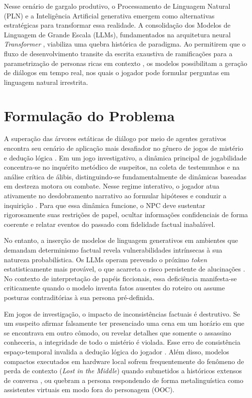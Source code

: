 Nesse cenário de gargalo produtivo, o Processamento de Linguagem Natural (PLN) e a Inteligência Artificial generativa emergem como alternativas estratégicas para transformar essa realidade. A consolidação dos Modelos de Linguagem de Grande Escala (LLMs), fundamentados na arquitetura neural \textit{Transformer} \cite{vaswani2017attention}, viabiliza uma quebra histórica de paradigma. Ao permitirem que o fluxo de desenvolvimento transite da escrita exaustiva de ramificações para a parametrização de personas ricas em contexto \cite{shanahan2023role}, os modelos possibilitam a geração de diálogos em tempo real, nos quais o jogador pode formular perguntas em linguagem natural irrestrita.

\section{Formulação do Problema}
\label{sec:problema}

A superação das árvores estáticas de diálogo por meio de agentes gerativos encontra seu cenário de aplicação mais desafiador no gênero de jogos de mistério e dedução lógica \cite{fernandez2014introduction}. Em um jogo investigativo, a dinâmica principal de jogabilidade concentra-se no inquérito metódico de suspeitos, na coleta de testemunhos e na análise crítica de álibis, distinguindo-se fundamentalmente de dinâmicas baseadas em destreza motora ou combate. Nesse regime interativo, o jogador atua ativamente no desdobramento narrativo ao formular hipóteses e conduzir a inquirição \cite{fernandez2014introduction}. Para que essa dinâmica funcione, o NPC deve sustentar rigorosamente suas restrições de papel, ocultar informações confidenciais de forma coerente e relatar eventos do passado com fidelidade factual inabalável.

No entanto, a inserção de modelos de linguagem generativos em ambientes que demandam determinismo factual revela vulnerabilidades intrínsecas à sua natureza probabilística. Os LLMs operam prevendo o próximo \textit{token} estatisticamente mais provável, o que acarreta o risco persistente de alucinações \cite{ji2023survey}. No contexto de interpretação de papéis ficcionais, essa deficiência manifesta-se criticamente quando o modelo inventa fatos ausentes do roteiro ou assume posturas contraditórias à sua persona pré-definida.

Em jogos de investigação, o impacto de inconsistências factuais é destrutivo. Se um suspeito afirmar falsamente ter presenciado uma cena em um horário em que se encontrava em outro cômodo, ou revelar detalhes que somente o assassino conheceria, a integridade de todo o mistério é violada. Esse erro de consistência espaço-temporal invalida a dedução lógica do jogador \cite{ahn2024timechara}. Além disso, modelos compactos executados em hardware local sofrem frequentemente do fenômeno de perda de contexto (\textit{Lost in the Middle}) quando submetidos a históricos extensos de conversa \cite{liu2024lost}, ou quebram a persona respondendo de forma metalinguística como assistentes virtuais em modo fora do personagem (OOC).

